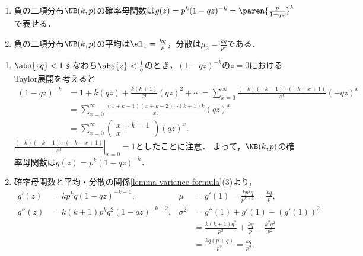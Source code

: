 \documentclass[uplatex,dvipdfmx]{jsreport}
\begin{document}
\begin{proposition}[負の二項分布の確率母関数・平均・分散]\mbox{}
    \begin{enumerate}
        \item 負の二項分布$\NB(k,p)$の確率母関数は$g(z)=p^k(1-qz)^{-k}=\paren{\frac{p}{1-qz}}^k$で表せる．
        \item 負の二項分布$\NB(k,p)$の平均は$\al_1=\frac{kq}{p}$，分散は$\mu_2=\frac{kq}{p^2}$である．
    \end{enumerate}
\end{proposition}
\begin{Proof}\mbox{}
    \begin{enumerate}
        \item $\abs{zq}<1$すなわち$\abs{z}<\frac{1}{q}$のとき，$(1-qz)^{-k}$の$z=0$におけるTaylor展開を考えると
        \begin{align*}
            (1-qz)^{-k}&=1+k(qz)+\frac{k(k+1)}{2!}(qz)^2+\cdots=\sum^\infty_{x=0}\frac{(-k)(-k-1)\cdots(-k-x+1)}{x!}(-qz)^x\\
            &=\sum^\infty_{x=0}\frac{(x+k-1)(x+k-2)\cdots(k+1)k}{x!}(qz)^x\\
            &=\sum^\infty_{x=0}\begin{pmatrix}x+k-1\\x\end{pmatrix}(qz)^x.
        \end{align*}
        $\left.\frac{(-k)(-k-1)\cdots(-k-x+1)}{x!}\right|_{x=0}=1$としたことに注意．
        よって，$\NB(k,p)$の確率母関数は$g(z)=p^k(1-qz)^{-k}$．
        \item 確率母関数と平均・分散の関係\ref{lemma-variance-formula}(3)より，
        \begin{align*}
            g'(z)&=kp^kq(1-qz)^{-k-1},&\mu&=g'(1)=\frac{kp^kq}{p^{k+1}}=\frac{kq}{p},\\
            g''(z)&=k(k+1)p^kq^2(1-qz)^{-k-2},&\sigma^2&=g''(1)+g'(1)-(g'(1))^2\\
            &&&=\frac{k(k+1)q^2}{p^2}+\frac{kq}{p}-\frac{k^2q^2}{p^2}\\
            &&&=\frac{kq(p+q)}{p^2}=\frac{kq}{p^2}.
        \end{align*}
    \end{enumerate}
\end{Proof}
\end{document}
